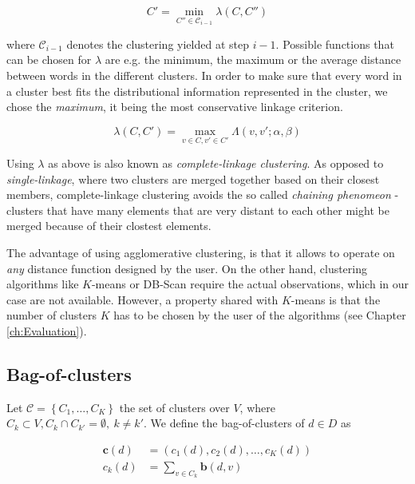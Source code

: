 \begin{equation*}
 C' = \min\limits_{C'' \in \mathcal{C}_{i-1}} \lambda(C,C'') 
\end{equation*}

where $\mathcal{C}_{i-1}$ denotes the clustering yielded at step $i-1$.
Possible functions that can be chosen for $\lambda$ are e.g. the minimum, the
maximum or the average distance between words in the different clusters. In order to make sure that every word in a
cluster best fits the distributional information represented in the cluster, we
chose the \emph{maximum}, it being the most conservative linkage criterion.  

\begin{equation*}
	\lambda(C,C') = \max\limits_{v \in C, v' \in C' } \Lambda(v,v';\alpha, \beta)
\end{equation*}

Using $\lambda$ as above is also known as \emph{complete-linkage clustering}.
As opposed to \emph{single-linkage}, where two clusters are merged together
based on their closest members, complete-linkage clustering avoids the
so called \emph{chaining phenomeon} - clusters that have many elements
that are very distant to each other might be merged because of their clostest
elements.

The advantage of using agglomerative clustering, is that it allows to operate on
\emph{any} distance function designed by the user. On the other hand, clustering
algorithms like $K$-means or DB-Scan require the actual observations,
which in our case are not available. However, a property shared with $K$-means
is that the number of clusters $K$ has to be chosen by the user of the
algorithms (see Chapter \ref{ch:Evaluation}).

\subsection{Bag-of-clusters}

Let $\mathcal{C} = \left\{ C_1,\ldots,C_K \right\} $ the set of clusters
over $V$, where $C_k \subset V, C_k \cap C_{k'} = \emptyset,~k \neq
k'$. We define the bag-of-clusters of $d \in D$ as  

\begin{equation*}
\begin{split}
	 \mathbf{c}(d) &= (c_1(d),c_2(d),\ldots,c_K(d)) \\
	 c_k(d) &= \sum\limits_{v \in C_k} \mathbf{b}(d,v)
\end{split}
\end{equation*}

